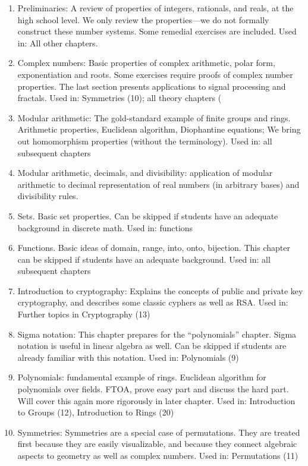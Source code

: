 \begin{enumerate}
\item
Preliminaries: A review of properties of integers, rationals, and reals, at the high school level. We only review the properties—we do not formally construct these number systems. Some remedial exercises are included.  Used in: All other chapters.
\item
Complex numbers: Basic properties of complex arithmetic, polar form, exponentiation and roots. Some exercises require proofs of complex number properties.  The last section presents applications to signal processing and fractals. Used in: Symmetries (10); all theory chapters (  
\item
Modular arithmetic:  The gold-standard example of finite groups and rings.  Arithmetic properties, Euclidean algorithm, Diophantine equations; We bring out homomorphism properties (without the terminology).  Used in: all subsequent chapters
\item
Modular arithmetic, decimals, and divisibility: application of modular arithmetic to decimal representation of real numbers (in arbitrary bases) and divisibility rules. 
\item
Sets.  Basic set properties. Can be skipped if students have an adequate background in discrete math. Used in: functions
\item
Functions. Basic ideas of domain, range, into, onto, bijection.  This chapter can be skipped if students have an adequate background.  Used in: all subsequent chapters
\item
Introduction to cryptography:  Explains the concepts of public and private key cryptography, and describes some classic cyphers as well as RSA. Used in:  Further topics in Cryptography (13)
\item
Sigma notation: This chapter prepares for the “polynomials” chapter.  Sigma notation is useful in linear algebra as well. Can be skipped if students are already familiar with this notation. Used in: Polynomials (9) 
\item
Polynomials: fundamental example of rings. Euclidean algorithm for polynomials over fields. FTOA, prove easy part and discuss the hard part.  Will cover this again more rigorously in later chapter. Used in:  Introduction to Groups (12), Introduction to Rings (20)
\item
Symmetries: Symmetries are a special case of permutations. They are treated first because they are easily visualizable, and because they connect algebraic aspects to geometry as well as complex numbers.  Used in:  Permutations (11)

\end{enumerate}
